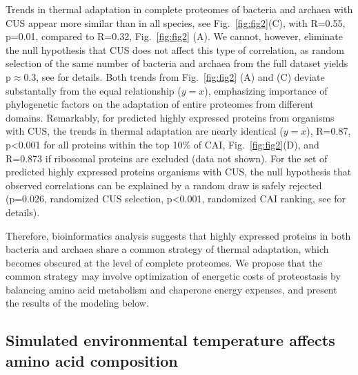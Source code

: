 \documentclass[10pt,letterpaper]{article}
\begin{document}
Trends in thermal adaptation in complete proteomes of bacteria and archaea with CUS appear more similar than in all species, see Fig.~\ref{fig:fig2}(C), with R=0.55, p=0.01, compared to R=0.32, Fig.~\ref{fig:fig2} (A). We cannot, however, eliminate the null hypothesis that CUS does not affect this type of correlation, as random selection of the same number of bacteria and archaea from the full dataset yields p$\approx$0.3, see  for details. Both trends from Fig.~\ref{fig:fig2} (A) and (C) deviate substantally from the equal relationship ($y=x$), emphasizing importance of phylogenetic factors on the adaptation of entire proteomes from different domains. Remarkably, for predicted highly expressed proteins from organisms with CUS, the trends in thermal adaptation are nearly identical ($y=x$), R=0.87, p\textless 0.001 for all proteins within the top 10\% of CAI, Fig.~\ref{fig:fig2}(D), and R=0.873 if ribosomal proteins are excluded (data not shown). For the set of predicted highly expressed proteins organisms with CUS, the null hypothesis that observed correlations can be explained by a random draw is safely rejected (p=0.026, randomized CUS selection,  p\textless0.001, randomized CAI ranking, see  for details).

Therefore, bioinformatics analysis suggests that highly expressed proteins in both bacteria and archaea share a common strategy of thermal adaptation, which becomes obscured at the level of complete proteomes. We propose that the common strategy may involve optimization of energetic costs of proteostasis by balancing amino acid metabolism and chaperone energy expenses, and present the results of the modeling below. 

\subsection*{Simulated environmental temperature affects amino acid composition}
\end{document}
